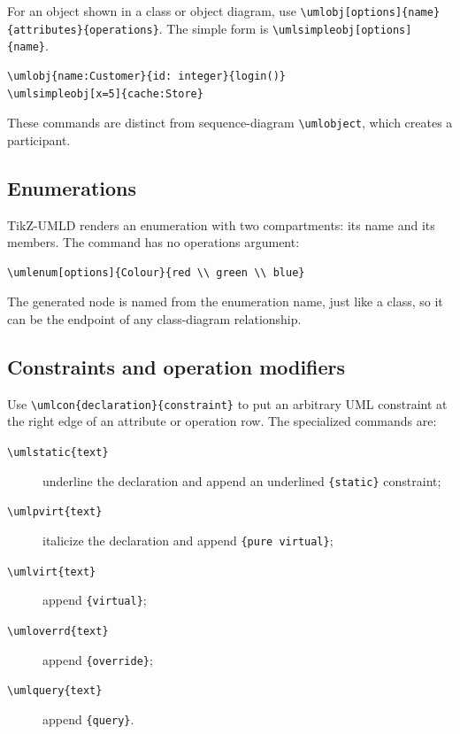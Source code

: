 \documentclass[a4paper,11pt]{report}
\begin{document}
For an object shown in a class or object diagram, use
\lstinline!\umlobj[options]{name}{attributes}{operations}!. The simple form is
\lstinline!\umlsimpleobj[options]{name}!.

\begin{lstlisting}
\umlobj{name:Customer}{id: integer}{login()}
\umlsimpleobj[x=5]{cache:Store}
\end{lstlisting}

These commands are distinct from sequence-diagram \lstinline!\umlobject!,
which creates a participant.

\subsection{Enumerations}

TikZ-UMLD renders an enumeration with two compartments: its name and its
members. The command has no operations argument:

\begin{lstlisting}
\umlenum[options]{Colour}{red \\ green \\ blue}
\end{lstlisting}

The generated node is named from the enumeration name, just like a class, so it
can be the endpoint of any class-diagram relationship.

\subsection{Constraints and operation modifiers}

Use \lstinline!\umlcon{declaration}{constraint}! to put an arbitrary UML
constraint at the right edge of an attribute or operation row. The specialized
commands are:

\begin{description}
	\item[\texttt{\textbackslash umlstatic\{text\}}] underline the declaration and
	      append an underlined \texttt{\{static\}} constraint;
	\item[\texttt{\textbackslash umlpvirt\{text\}}] italicize the declaration and
	      append \texttt{\{pure virtual\}};
	\item[\texttt{\textbackslash umlvirt\{text\}}] append
	      \texttt{\{virtual\}};
	\item[\texttt{\textbackslash umloverrd\{text\}}] append
	      \texttt{\{override\}};
	\item[\texttt{\textbackslash umlquery\{text\}}] append
	      \texttt{\{query\}}.
\end{description}
\end{document}
